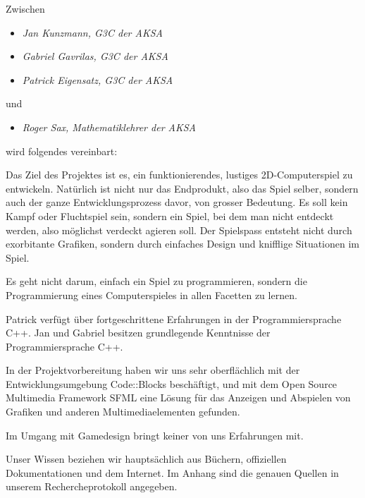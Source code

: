 \documentclass[parskip=half]{scrreprt}
\begin{document}
 
  

\begin{contract} 
Zwischen
\begin{itemize}
\item \textit{Jan Kunzmann, G3C der AKSA}
\item \textit{Gabriel Gavrilas, G3C der AKSA}
\item \textit{Patrick Eigensatz, G3C der AKSA}
\end{itemize}
und
\begin{itemize}
\item \textit{Roger Sax, Mathematiklehrer der AKSA}
\end{itemize}
wird folgendes vereinbart:



  
Das Ziel des Projektes ist es, ein funktionierendes, lustiges 2D-Computerspiel zu entwickeln. Natürlich
ist nicht nur das Endprodukt, also das Spiel selber, sondern auch der ganze
Entwicklungsprozess davor, von grosser Bedeutung. Es soll kein Kampf oder Fluchtspiel sein, sondern ein Spiel,
bei dem man nicht entdeckt werden, also möglichst verdeckt agieren soll. Der Spielspass entsteht nicht durch exorbitante Grafiken, sondern durch einfaches Design und knifflige Situationen im Spiel.

Es geht nicht darum, einfach ein Spiel zu programmieren, sondern die Programmierung eines Computerspieles in allen Facetten zu lernen.


Patrick verfügt über fortgeschrittene Erfahrungen in der Programmiersprache C++. Jan und Gabriel besitzen grundlegende Kenntnisse der Programmiersprache C++.

In der Projektvorbereitung haben wir uns sehr oberflächlich mit der Entwicklungsumgebung Code::Blocks beschäftigt, und mit dem Open Source Multimedia Framework SFML eine Lösung für das Anzeigen und Abspielen von Grafiken und anderen Multimediaelementen gefunden.

Im Umgang mit Gamedesign bringt keiner von uns Erfahrungen mit.

Unser Wissen beziehen wir hauptsächlich aus Büchern, offiziellen Dokumentationen und dem Internet. Im Anhang sind die genauen Quellen in unserem Rechercheprotokoll angegeben.



\end{contract}
\end{document}

